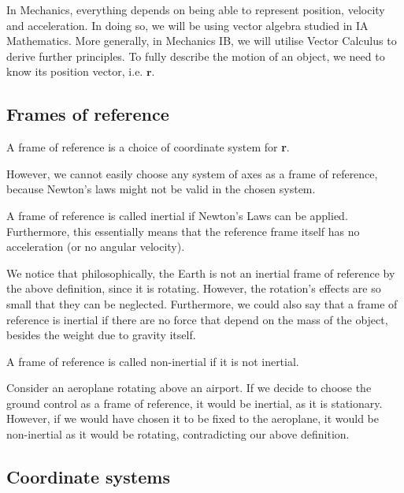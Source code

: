 \documentclass[12pt]{article}
\begin{document}
In Mechanics, everything depends on being able to represent position, velocity and acceleration. In doing so, we will be using vector algebra studied in IA Mathematics. More generally, in Mechanics IB, we will utilise Vector Calculus to derive further principles. To fully describe the motion of an object, we need to know its position vector, i.e. $\textbf{r}$. 

\subsection{Frames of reference}

\begin{definition}
    A frame of reference is a choice of coordinate system for \textbf{r}.
\end{definition}

However, we cannot easily choose any system of axes as a frame of reference, because Newton's laws might not be valid in the chosen system.

\begin{definition}
    A frame of reference is called inertial if Newton's Laws can be applied. Furthermore, this essentially means that the reference frame itself has no acceleration (or no angular velocity).
\end{definition}

We notice that philosophically, the Earth is not an inertial frame of reference by the above definition, since it is rotating. However, the rotation's effects are so small that they can be neglected. Furthermore, we could also say that a frame of reference is inertial if there are no force that depend on the mass of the object, besides the weight due to gravity itself.

\begin{definition}
    A frame of reference is called non-inertial if it is not inertial.
\end{definition}

\begin{example}
    Consider an aeroplane rotating above an airport. If we decide to choose the ground control as a frame of reference, it would be inertial, as it is stationary. However, if we would have chosen it to be fixed to the aeroplane, it would be non-inertial as it would be rotating, contradicting our above definition.
\end{example}

\subsection{Coordinate systems}
\end{document}
